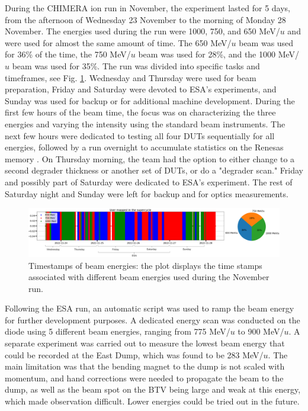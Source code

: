 \documentclass{cernatsnote}
\begin{document}
During the CHIMERA ion run in November, the experiment lasted for 5 days, from the afternoon of Wednesday 23 November to the  morning of Monday 28 November. The energies used during the run were 1000, 750, and 650 MeV/$u$ and were used for almost the same amount of time. The 650 MeV/$u$ beam was used for 36\% of the time, the 750 MeV/$u$ beam was used for 28\%, and the 1000 MeV/$u$ beam was used for 35\%. The run was divided into specific tasks and timeframes, see Fig. \ref{fig:timestamp_energies}. Wednesday and Thursday were used for beam preparation, Friday and Saturday were devoted to ESA's experiments, and Sunday was used for backup or for additional machine development. During the first few hours of the beam time, the focus was on characterizing the three energies and varying the intensity using the standard beam instruments. The next few hours were dedicated to testing all four DUTs sequentially for all energies, followed by a run overnight to accumulate statistics on the Renesas memory \cite{noauthor_rmlv0816bgsa_nodate}. On Thursday morning, the team had the option to either change to a second degrader thickness or another set of DUTs, or do a "degrader scan." Friday and possibly part of Saturday were dedicated to ESA's experiment. The rest of Saturday night and Sunday were left for backup and for optics measurements.

\begin{figure}[!htb]
\centering
\includegraphics[width=1.0\textwidth]{images/PS_BEAM_ENERGY/user_mapping_timestamp.png}
\caption{Timestamps of beam energies: the plot displays the time stamps associated with different beam energies used during the November run.}
\label{fig:timestamp_energies}
\end{figure}

Following the ESA run, an automatic script was used to ramp the beam energy for further development purposes. A dedicated energy scan was conducted on the diode using 5 different beam energies, ranging from 775 MeV/$u$ to 900 MeV/$u$. A separate experiment was carried out to measure the lowest beam energy that could be recorded at the East Dump, which was found to be 283 MeV/$u$. The main limitation was that the bending magnet to the dump is not scaled with momentum, and hand corrections were needed to propagate the beam to the dump, as well as the beam spot on the BTV being large and weak at this energy, which made observation difficult. Lower energies could be tried out in the future.
\end{document}
